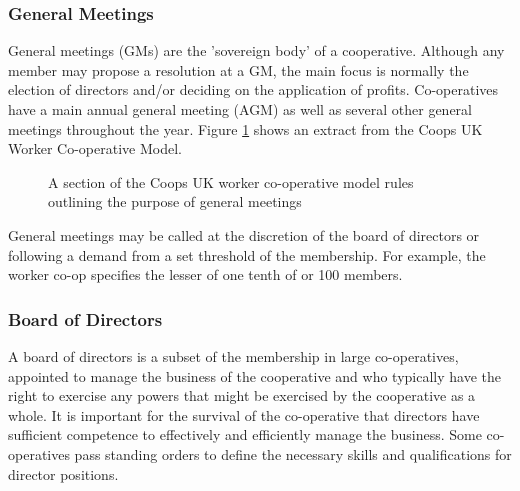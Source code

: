 \subsubsection{General Meetings}
General meetings (GMs) are the 'sovereign body' of a cooperative. Although any member may propose a resolution at a GM, the main focus is normally the election of directors and/or deciding on the application of profits. Co-operatives have a main annual general meeting (AGM) as well as several other general meetings throughout the year. Figure \ref{fig:workerCoopGM} shows an extract from the Coops UK Worker Co-operative Model.\\
\begin{figure}
\centering
{}
\decoRule
\caption[]{A section of the Coops UK worker co-operative model rules outlining the purpose of general meetings}
\label{fig:workerCoopGM}
\end{figure} 

General meetings may be called at the discretion of the board of directors or following a demand from a set threshold of the membership. For example, the worker co-op specifies the lesser of one tenth of or 100 members.

\subsubsection{Board of Directors}
A board of directors is a subset of the membership in large co-operatives, appointed to manage the business of the cooperative and who typically have the right to exercise any powers that might be exercised by the cooperative as a whole. It is important for the survival of the co-operative that directors have sufficient competence to effectively and efficiently manage the business. Some co-operatives pass standing orders to define the necessary skills and qualifications for director positions.

